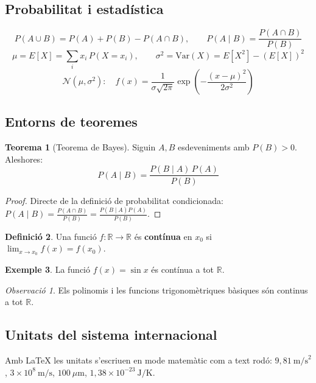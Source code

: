 \documentclass[informe, catalan]{practicaitic}
\theoremstyle{definition}
\newtheorem{teorema}{Teorema}[section]
\newtheorem{definicio}[teorema]{Definició}
\newtheorem{exemple}[teorema]{Exemple}
\theoremstyle{remark}
\newtheorem*{observacio}{Observació}
\begin{document}
\subsection{Probabilitat i estadística}

\[
P(A \cup B) = P(A) + P(B) - P(A \cap B), \qquad
P(A \mid B) = \frac{P(A \cap B)}{P(B)}
\]
\[
\mu = E[X] = \sum_{i} x_i\,P(X=x_i), \qquad
\sigma^2 = \text{Var}(X) = E[X^2] - (E[X])^2
\]
\[
\mathcal{N}(\mu, \sigma^2):\quad f(x) = \frac{1}{\sigma\sqrt{2\pi}}
\exp\!\left(-\frac{(x-\mu)^2}{2\sigma^2}\right)
\]

\subsection{Entorns de teoremes}

\begin{teorema}[Teorema de Bayes]
Siguin $A, B$ esdeveniments amb $P(B) > 0$. Aleshores:
\[
  P(A \mid B) = \frac{P(B \mid A)\,P(A)}{P(B)}
\]
\end{teorema}

\begin{proof}
Directe de la definició de probabilitat condicionada:
$P(A \mid B) = \frac{P(A \cap B)}{P(B)} = \frac{P(B \mid A)P(A)}{P(B)}$.
\end{proof}

\begin{definicio}
Una funció $f: \mathbb{R} \to \mathbb{R}$ és \textbf{contínua} en $x_0$ si
$\lim_{x \to x_0} f(x) = f(x_0)$.
\end{definicio}

\begin{exemple}
La funció $f(x) = \sin x$ és contínua a tot $\mathbb{R}$.
\end{exemple}

\begin{observacio}
Els polinomis i les funcions trigonomètriques bàsiques són continus a tot $\mathbb{R}$.
\end{observacio}

\subsection{Unitats del sistema internacional}

Amb LaTeX les unitats s'escriuen en mode matemàtic com a text rodó:
$9{,}81\ \text{m/s}^2$, \quad $3 \times 10^8\ \text{m/s}$, \quad
$100\ \mu\text{m}$, \quad $1{,}38 \times 10^{-23}\ \text{J/K}$.


\end{document}
